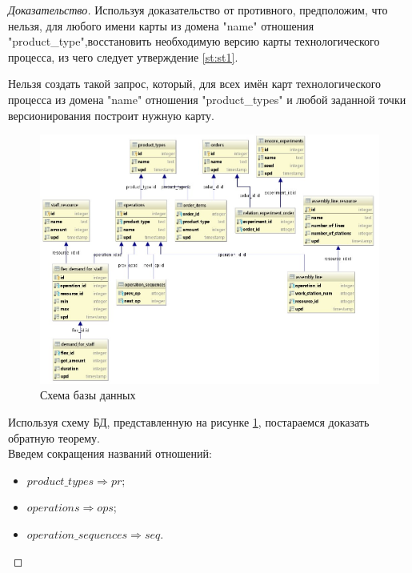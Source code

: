 \begin{proof}[Доказательство]
	Используя доказательство от противного, предположим, что нельзя, для любого имени карты из домена "name" отношения "product\_type",восстановить необходимую версию карты технологического процесса, из чего следует утверждение \ref{st:st1}.
	\begin{state}
		\label{st:st1}
		Нельзя создать такой запрос, который, для всех имён карт технологического процесса из домена "name" отношения "product\_types" и любой заданной точки версионирования построит нужную карту.
	\end{state}

	\begin{figure}[ht]
		\centering
		\includegraphics[width=\linewidth]{pics/databaseSchema.png}
		\caption{Схема базы данных}
		\label{fig:dbschema}
	\end{figure}

	\indent Используя схему БД, представленную на рисунке \ref{fig:dbschema}, постараемся доказать обратную теорему.\\
	\indent Введем сокращения названий отношений:

	\begin{itemize}
		\item $product\_types \Rightarrow pr$;
		\item $operations \Rightarrow ops$;
		\item $operation\_sequences \Rightarrow seq$.
	\end{itemize}


\end{proof}
